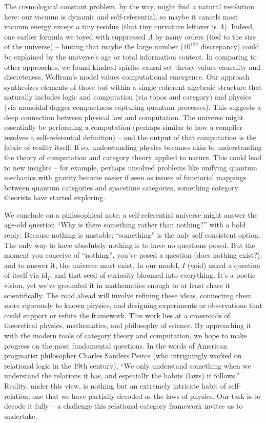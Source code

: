 \documentclass{article}
\begin{document}
The cosmological constant problem, by the way, might find a natural resolution here: our vacuum is dynamic and self-referential, so maybe it cancels most vacuum energy except a tiny residue (that tiny curvature leftover is $\Lambda$). Indeed, one earlier formula we toyed with suppressed $\Lambda$ by many orders (tied to the size of the universe)\cite{carlip2017} – hinting that maybe the large number ($10^{122}$ discrepancy) could be explained by the universe’s age or total information content. In comparing to other approaches, we found kindred spirits: causal set theory values causality and discreteness\cite{bombelli1987}, Wolfram’s model values computational emergence\cite{wolfram2020}. Our approach synthesizes elements of those but within a single coherent algebraic structure that naturally includes logic and computation (via topos and category) and physics (via monoidal dagger compactness capturing quantum processes\cite{abramsky2009}). This suggests a deep connection between physical law and computation. The universe might essentially be performing a computation (perhaps similar to how a compiler resolves a self-referential definition) – and the output of that computation is the fabric of reality itself. If so, understanding physics becomes akin to understanding the theory of computation and category theory applied to nature. This could lead to new insights – for example, perhaps unsolved problems like unifying quantum mechanics with gravity become easier if seen as issues of functorial mappings between quantum categories and spacetime categories, something category theorists have started exploring. 

We conclude on a philosophical note: a self-referential universe might answer the age-old question “Why is there something rather than nothing?” with a bold reply: Because nothing is unstable; “something” is the only self-consistent option. The only way to have absolutely nothing is to have no questions posed. But the moment you conceive of “nothing”, you’ve posed a question (does nothing exist?), and to answer it, the universe must exist. In our model, $I$ (void) asked a question of itself via $\mathrm{id}_I$, and that seed of curiosity bloomed into everything. It’s a poetic vision, yet we’ve grounded it in mathematics enough to at least chase it scientifically. The road ahead will involve refining these ideas, connecting them more rigorously to known physics, and designing experiments or observations that could support or refute the framework. This work lies at a crossroads of theoretical physics, mathematics, and philosophy of science. By approaching it with the modern tools of category theory and computation, we hope to make progress on the most fundamental questions. In the words of American pragmatist philosopher Charles Sanders Peirce (who intriguingly worked on relational logic in the 19th century), “We only understand something when we understand the relations it has, and especially the habits (laws) it follows.” Reality, under this view, is nothing but an extremely intricate habit of self-relation, one that we have partially decoded as the laws of physics. Our task is to decode it fully – a challenge this relational-category framework invites us to undertake.



\end{document}
